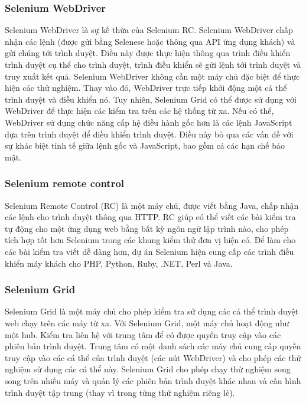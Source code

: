		\subsubsection{Selenium WebDriver}
		Selenium WebDriver là sự kế thừa của Selenium RC. Selenium WebDriver chấp nhận các lệnh (được gửi bằng Selenese hoặc thông qua API ứng dụng khách) và gửi chúng tới trình duyệt. Điều này được thực hiện thông qua trình điều khiển trình duyệt cụ thể cho trình duyệt, trình điều khiển sẽ gửi lệnh tới trình duyệt và truy xuất kết quả. Selenium WebDriver không cần một máy chủ đặc biệt để thực hiện các thử nghiệm. Thay vào đó, WebDriver trực tiếp khởi động một cá thể trình duyệt và điều khiển nó. Tuy nhiên, Selenium Grid có thể được sử dụng với WebDriver để thực hiện các kiểm tra trên các hệ thống từ xa. Nếu có thể, WebDriver sử dụng chức năng cấp hệ điều hành gốc hơn là các lệnh JavaScript dựa trên trình duyệt để điều khiển trình duyệt. Điều này bỏ qua các vấn đề với sự khác biệt tinh tế giữa lệnh gốc và JavaScript, bao gồm cả các hạn chế bảo mật.
		\subsubsection{Selenium remote control}
		Selenium Remote Control (RC) là một máy chủ, được viết bằng Java, chấp nhận các lệnh cho trình duyệt thông qua HTTP. RC giúp có thể viết các bài kiểm tra tự động cho một ứng dụng web bằng bất kỳ ngôn ngữ lập trình nào, cho phép tích hợp tốt hơn Selenium trong các khung kiểm thử đơn vị hiện có. Để làm cho các bài kiểm tra viết dễ dàng hơn, dự án Selenium hiện cung cấp các trình điều khiển máy khách cho PHP, Python, Ruby, .NET, Perl và Java.
		\subsubsection{Selenium Grid}
		Selenium Grid là một máy chủ cho phép kiểm tra sử dụng các cá thể trình duyệt web chạy trên các máy từ xa. Với Selenium Grid, một máy chủ hoạt động như một hub. Kiểm tra liên hệ với trung tâm để có được quyền truy cập vào các phiên bản trình duyệt. Trung tâm có một danh sách các máy chủ cung cấp quyền truy cập vào các cá thể của trình duyệt (các nút WebDriver) và cho phép các thử nghiệm sử dụng các cá thể này. Selenium Grid cho phép chạy thử nghiệm song song trên nhiều máy và quản lý các phiên bản trình duyệt khác nhau và cấu hình trình duyệt tập trung (thay vì trong từng thử nghiệm riêng lẻ).
	

